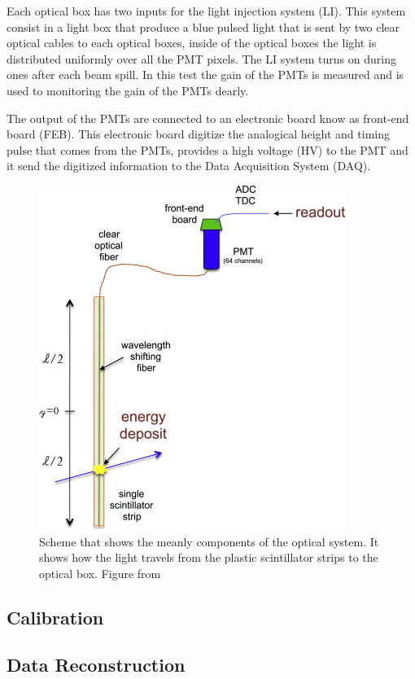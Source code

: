 Each optical box has two inputs for the light injection system (LI). This system consist in a light box that produce a blue pulsed light that is sent by two clear optical cables to each optical boxes, inside of the optical boxes the light is distributed uniformly over all the PMT pixels. The LI system turns on during ones after each beam spill. In this test the gain of the PMTs is measured and is used to monitoring the gain of the PMTs dearly. 

The output of the PMTs are connected to an electronic board know as front-end board (FEB). This electronic board digitize the analogical height and timing pulse that comes from the PMTs, provides a high voltage (HV) to the PMT and it send the digitized information to the Data Acquisition System (DAQ). 

\begin{figure}
    \centering
    \includegraphics{Figures/Chapter2/OpticalSystem.jpg}
    \caption{Scheme that shows the meanly components of the optical system. It shows how the light travels from the plastic scintillator strips to the optical box. Figure from \cite{ALIAGA2014130}}
    \label{fig:enter-label}
\end{figure}

\subsection{Calibration}
\label{Cap:MnvExp:MnvDetector:Calibration}

\subsection{Data Reconstruction}
\label{Cap:MnvExp:MnvDetector:DataReconstruction}

